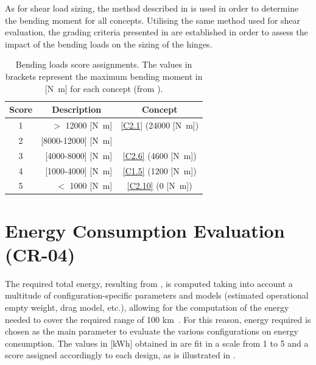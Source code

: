 As for shear load sizing, the method described in  is used in order to determine the bending moment for all concepts.
Utilising the same method used for shear evaluation, the grading criteria presented in  are established in order to assess the impact of the bending loads on the sizing of the hinges.
\begin{table}[ht]
\centering
\caption{Bending loads score assignments. The values in brackets represent the maximum bending moment in [\unit{\N\m}] for each concept (from ).}
\label{tab:bending}
\begin{tabular}{c|r|c}
\toprule
  
\textbf{Score} & \multicolumn{1}{c|}{\textbf{Description}}     & \textbf{Concept} \\ \bottomrule
\rowcolor[HTML]{FD6864} 
1              & $>$ 12000  [\unit{\N\m}] & \ref{C2.1} (24000 [\unit{\N\m}])             \\
\rowcolor[HTML]{FCBF7B} 
2              & [8000-12000]  [\unit{\N\m}]     &                  \\
\rowcolor[HTML]{E0E383} 
3              & [4000-8000] [\unit{\N\m}] & \ref{C2.6} (4600 [\unit{\N\m}])             \\
\rowcolor[HTML]{A2D07F} 
4              & [1000-4000]  [\unit{\N\m}]  & \ref{C1.5} (1200 [\unit{\N\m}])  \\
\rowcolor[HTML]{63BE7B} 
5              & $<$ 1000        [\unit{\N\m}]     & \ref{C2.10} (0 [\unit{\N\m}])              \\ \toprule
\end{tabular}
\end{table}


\section{Energy Consumption Evaluation (CR-04)}
The required total energy, resulting from , is computed taking into account a multitude of configuration-specific parameters and models (estimated operational empty weight, drag model, etc.), allowing for the computation of the energy needed to cover the required range of 100 km~\cite{baselinerepo}.
For this reason, energy required is chosen as the main parameter to evaluate the various configurations on energy consumption.
The values in [{\unit{\kWh}}] obtained in  are fit in a scale from 1 to 5 and a score assigned accordingly to each design, as is illustrated in .


